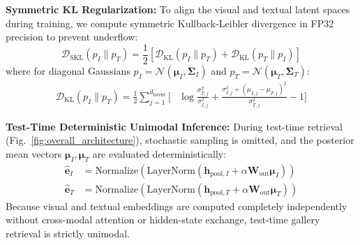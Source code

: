 \documentclass[journal]{IEEEtran}
\begin{document}
\textbf{Symmetric KL Regularization:} To align the visual and textual latent spaces during training, we compute symmetric Kullback-Leibler divergence in FP32 precision to prevent underflow:
\begin{equation}
\mathcal{D}_{\text{SKL}}(p_I \parallel p_T) = \frac{1}{2} \left[ \mathcal{D}_{\text{KL}}(p_I \parallel p_T) + \mathcal{D}_{\text{KL}}(p_T \parallel p_I) \right]
\end{equation}
where for diagonal Gaussians $p_I = \mathcal{N}(\boldsymbol{\mu}_I, \boldsymbol{\Sigma}_I)$ and $p_T = \mathcal{N}(\boldsymbol{\mu}_T, \boldsymbol{\Sigma}_T)$:
\begin{align}
\mathcal{D}_{\text{KL}}(p_I \parallel p_T) = \frac{1}{2} \sum_{j=1}^{d_{\text{latent}}} \Bigg[ &\log \frac{\sigma_{T,j}^2}{\sigma_{I,j}^2} + \frac{\sigma_{I,j}^2 + (\mu_{I,j} - \mu_{T,j})^2}{\sigma_{T,j}^2} - 1 \Bigg]
\end{align}

\textbf{Test-Time Deterministic Unimodal Inference:} During test-time retrieval (Fig.~\ref{fig:overall_architecture}), stochastic sampling is omitted, and the posterior mean vectors $\boldsymbol{\mu}_I, \boldsymbol{\mu}_T$ are evaluated deterministically:
\begin{align}
\hat{\mathbf{e}}_I &= \text{Normalize}\left( \text{LayerNorm}(\mathbf{h}_{\text{pool}, I} + \alpha \mathbf{W}_{\text{out}} \boldsymbol{\mu}_I) \right) \\
\hat{\mathbf{e}}_T &= \text{Normalize}\left( \text{LayerNorm}(\mathbf{h}_{\text{pool}, T} + \alpha \mathbf{W}_{\text{out}} \boldsymbol{\mu}_T) \right)
\end{align}
Because visual and textual embeddings are computed completely independently without cross-modal attention or hidden-state exchange, test-time gallery retrieval is strictly unimodal.
\end{document}
